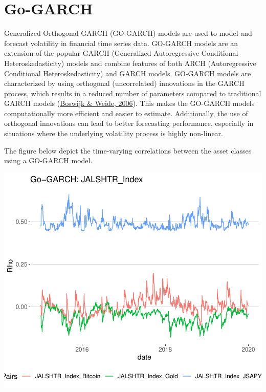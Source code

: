 \documentclass[11pt,preprint, authoryear]{elsarticle}
\numberwithin{equation}{section}
\numberwithin{figure}{section}
\numberwithin{table}{section}
\begin{document}
\hypertarget{go-garch}{%
\section{Go-GARCH}\label{go-garch}}

Generalized Orthogonal GARCH (GO-GARCH) models are used to model and
forecast volatility in financial time series data. GO-GARCH models are
an extension of the popular GARCH (Generalized Autoregressive
Conditional Heteroskedasticity) models and combine features of both ARCH
(Autoregressive Conditional Heteroskedasticity) and GARCH models.
GO-GARCH models are characterized by using orthogonal (uncorrelated)
innovations in the GARCH process, which results in a reduced number of
parameters compared to traditional GARCH models
(\protect\hyperlink{ref-boswijk2006wake}{Boswijk \& Weide, 2006}). This
makes the GO-GARCH models computationally more efficient and easier to
estimate. Additionally, the use of orthogonal innovations can lead to
better forecasting performance, especially in situations where the
underlying volatility process is highly non-linear.

The figure below depict the time-varying correlations between the asset
classes using a GO-GARCH model.

\includegraphics{FinMetrics-Essay_files/figure-latex/unnamed-chunk-14-1.pdf}
\end{document}
